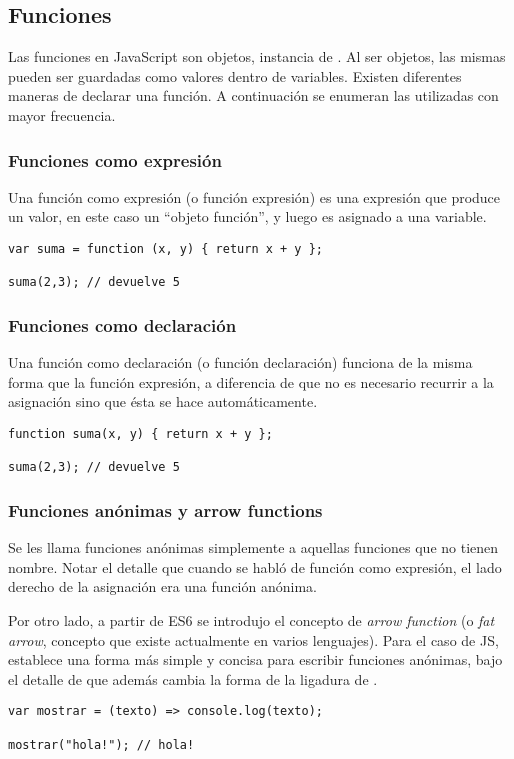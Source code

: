 \subsection{Funciones}
\label{sec:funciones}

Las funciones en JavaScript son objetos, instancia de . Al ser objetos, las mismas pueden ser guardadas como valores dentro de variables. Existen diferentes maneras de declarar una función. A continuación se enumeran las utilizadas con mayor frecuencia.

\subsubsection{Funciones como expresión}

Una función como expresión (o función expresión) es una expresión que produce un valor, en este caso un "`objeto función"', y luego es asignado a una variable.

\begin{lstlisting}[title={Función expresión}]
var suma = function (x, y) { return x + y };

suma(2,3); // devuelve 5
\end{lstlisting}

\subsubsection{Funciones como declaración}

Una función como declaración (o función declaración) funciona de la misma forma que la función expresión, a diferencia de que no es necesario recurrir a la asignación sino que ésta se hace automáticamente.

\begin{lstlisting}[title={Función declaración}]
function suma(x, y) { return x + y };

suma(2,3); // devuelve 5
\end{lstlisting}

\subsubsection{Funciones anónimas y arrow functions}

Se les llama funciones anónimas simplemente a aquellas funciones que no tienen nombre. Notar el detalle que cuando se habló de función como expresión, el lado derecho de la asignación era una función anónima.

Por otro lado, a partir de ES6 se introdujo el concepto de \textit{arrow function} (o \textit{fat arrow}, concepto que existe actualmente en varios lenguajes). Para el caso de JS, establece una forma más simple y concisa para escribir funciones anónimas, bajo el detalle de que además cambia la forma de la ligadura de .

\begin{lstlisting}[title={Arrow function}]
var mostrar = (texto) => console.log(texto);

mostrar("hola!"); // hola!
\end{lstlisting}